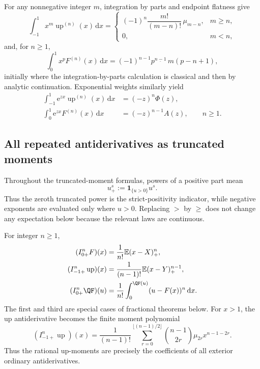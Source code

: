\documentclass[11pt,oneside]{article}
\theoremstyle{definition}
\theoremstyle{remark}
\newcommand{\Up}{\operatorname{up}}
\newcommand{\E}{\mathbb E}
\newcommand{\dd}{\,\mathrm d}
\newcommand{\e}{\mathrm e}
\newcommand{\fall}[2]{#1^{\underline{#2}}}
\newcommand{\1}{\mathbf 1}
\begin{document}
For any nonnegative integer \(m\), integration by parts and endpoint flatness
give
\begin{equation}
 \int_{-1}^1x^m\Up^{(n)}(x)\dd x
 =\begin{cases}
 (-1)^n\dfrac{m!}{(m-n)!}\,\mu_{m-n},&m\ge n,\\[0.8em]
 0,&m<n,
 \end{cases}
 \label{p8:eq:up-derivative-moments}
\end{equation}
and, for \(n\ge1\),
\begin{equation}
 \boxed{
 \int_0^1x^pF^{(n)}(x)\dd x
 =(-1)^{n-1}\fall{p}{n-1}\,m(p-n+1),}
 \label{p8:eq:F-derivative-moments}
\end{equation}
initially where the integration-by-parts calculation is classical and then by
analytic continuation.  Exponential weights similarly yield
\begin{align}
 \int_{-1}^1\e^{zx}\Up^{(n)}(x)\dd x&=(-z)^n\Phi(z),
 \label{p8:eq:up-derivative-exp}\\
 \int_0^1\e^{zx}F^{(n)}(x)\dd x&=(-z)^{n-1}A(z),\qquad n\ge1.
 \label{p8:eq:F-derivative-exp}
\end{align}

\subsection{All repeated antiderivatives as truncated moments}

Throughout the truncated-moment formulas, powers of a positive part mean
\[
 u_+^s:=\mathbf 1_{\{u>0\}}u^s.
\]
Thus the zeroth truncated power is the strict-positivity indicator, while
negative exponents are evaluated only where \(u>0\).  Replacing \(>\) by
\(\ge\) does not change any expectation below because the relevant laws are
continuous.

For integer \(n\ge1\),
\begin{align}
 (I_{0+}^{n}F)(x)
 &=\frac1{n!}\E(x-X)_+^n,
 \label{p8:eq:F-integer-primitive}\\
 (I_{-1+}^{n}\Up)(x)
 &=\frac1{(n-1)!}\E(x-Y)_+^{n-1},
 \label{p8:eq:up-integer-primitive}\\
 (I_{0+}^{n}\QF)(u)
 &=\frac1{n!}\int_0^{\QF(u)}(u-F(x))^n\dd x.
 \label{p8:eq:Q-integer-primitive}
\end{align}
The first and third are special cases of fractional theorems below.  For
\(x>1\), the up antiderivative becomes the finite moment polynomial
\begin{equation}
 (I_{-1+}^{n}\Up)(x)
 =\frac1{(n-1)!}
 \sum_{r=0}^{\lfloor(n-1)/2\rfloor}
 \binom{n-1}{2r}\mu_{2r}x^{n-1-2r}.
 \label{p8:eq:up-exterior-polynomial}
\end{equation}
Thus the rational up-moments are precisely the coefficients of all exterior
ordinary antiderivatives.
\end{document}
